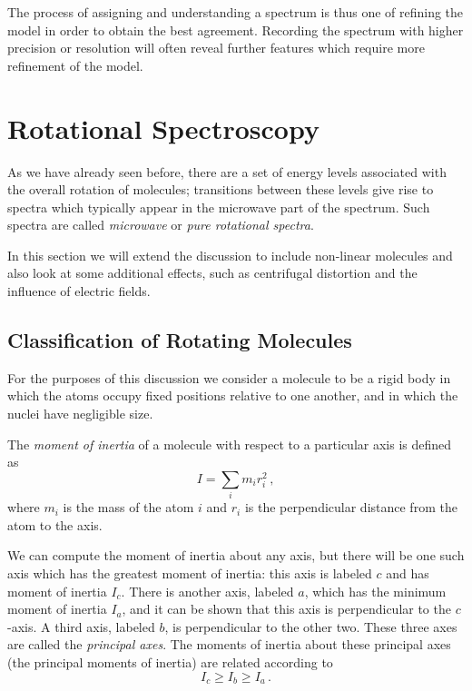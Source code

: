 \documentclass{article}
\theoremstyle{plain}\theoremheaderfont{\normalfont\itshape}\theorembodyfont{\rmfamily}\theoremseparator{.}\newtheorem*{rem}{Remark}\newtheorem*{ex}{Example}\newtheorem*{proof}{Proof}\newtheorem*{altp}{Alternative proof}
\theoremstyle{plain}\theoremheaderfont{\normalfont\bfseries}\theorembodyfont{\rmfamily}\theoremseparator{.}\newtheorem{thm}{Theorem}[section]\newtheorem{lem}[thm]{Lemma}\newtheorem{prop}[thm]{Proposition}\newtheorem*{cor}{Corollary}\newtheorem{defn}[thm]{Definition}\newtheorem{clm}[thm]{Claim}\newtheorem{clminproof}{Claim}\newtheorem{pos}{Postulate}[section]
\theoremstyle{break}\theoremheaderfont{\normalfont\itshape}\theorembodyfont{\rmfamily}\theoremseparator{.\medskip}\newtheorem*{proofskip}{Proof}\newtheorem*{exs}{Examples}\newtheorem*{rems}{Remarks}
\theoremstyle{break}\theoremheaderfont{\normalfont\bfseries}\theorembodyfont{\rmfamily}\theoremseparator{.\medskip}\newtheorem{lemskip}[thm]{Lemma}\newtheorem{defnskip}[thm]{Definition}\newtheorem{propskip}[thm]{Proposition}\newtheorem{thmskip}[thm]{Theorem}
\numberwithin{equation}{section}
\begin{document}
    The process of assigning and understanding a spectrum is thus one of refining the model in order to obtain the best agreement. Recording the spectrum with higher precision or resolution will often reveal further features which require more refinement of the model.

    \newpage
    \section{Rotational Spectroscopy}
    As we have already seen before, there are a set of energy levels associated with the overall rotation of molecules; transitions between these levels give rise to spectra which typically appear in the microwave part of the spectrum. Such spectra are called \textit{microwave} or \textit{pure rotational spectra}.

    In this section we will extend the discussion to include non-linear molecules and also look at some additional effects, such as centrifugal distortion and the influence of electric fields.

    \subsection{Classification of Rotating Molecules}
    For the purposes of this discussion we consider a molecule to be a rigid body in which the atoms occupy fixed positions relative to one another, and in which the nuclei have negligible size.

    The \textit{moment of inertia} of a molecule with respect to a particular axis is defined as
    \begin{equation}
        I=\sum_i m_ir_i^2\,,
    \end{equation}
    where \(m_i\) is the mass of the atom \(i\) and \(r_i\) is the perpendicular distance from the atom to the axis.

    We can compute the moment of inertia about any axis, but there will be one such axis which has the greatest moment of inertia: this axis is labeled \(c\) and has moment of inertia \(I_c\). There is another axis, labeled \(a\), which has the minimum moment of inertia \(I_a\), and it can be shown that this axis is perpendicular to the \(c\)-axis. A third axis, labeled \(b\), is perpendicular to the other two. These three axes are called the \textit{principal axes}. The moments of inertia about these principal axes (the principal moments of inertia) are related according to
    \begin{equation}
        I_c\ge I_b\ge I_a\,.
    \end{equation}
    
\end{document}
